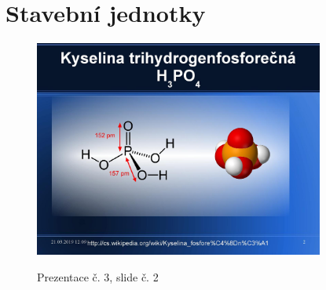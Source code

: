 \documentclass[DIV=8]{scrreprt}
\begin{document}
\section{Stavební jednotky} \label{Stavební jednotky}


\begin{figure}
    \caption{Prezentace č. 3, slide č. 2}
    \includegraphics[width=0.85\textwidth]{slides-3/slide-2.jpg}
    \centering
    \label{slides-3-slide-2}
\end{figure}
\end{document}
